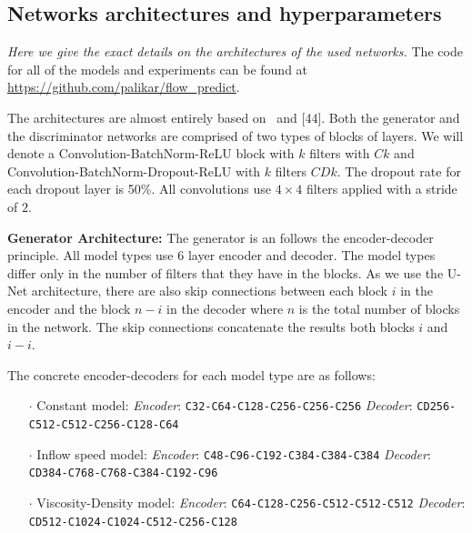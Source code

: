 \documentclass{llncs}
\begin{document}
\begin{subappendices}
\renewcommand{\thesection}{\Alph{section}}%

\section{Networks architectures and hyperparameters}
\label{app1}
\emph{Here we give the exact details on the architectures of the used networks.} The code for all of the models and experiments can be found at \url{https://github.com/palikar/flow_predict}.

The architectures are almost entirely based on~\cite{pix2pix} and [44]. Both the generator and the discriminator networks are comprised of two types of blocks of layers. We will denote a Convolution-BatchNorm-ReLU block with $k$ filters with $Ck$ and Convolution-BatchNorm-Dropout-ReLU with $k$ filters $CDk$. The dropout rate for each dropout layer is 50\%. All convolutions use $4\times4$ filters applied with a stride of $2$.

\noindent\textbf{Generator Architecture:}
The generator is an follows the encoder-decoder principle. All model types use 6 layer encoder and decoder. The model types differ only in the number of filters that they have in the blocks. As we use the U-Net architecture, there are also skip connections between each block $i$ in the encoder and the block $n-i$ in the decoder where $n$ is the total number of blocks in the network. The skip connections concatenate the results both blocks $i$ and $i-i$.

The concrete encoder-decoders for each model type are as follows:
\begin{itemize}
\item[$\cdot$] Constant model:\newline
  \emph{Encoder}: \texttt{C32-C64-C128-C256-C256-C256}\newline
  \emph{Decoder}: \texttt{CD256-C512-C512-C256-C128-C64}
\item[$\cdot$] Inflow speed model:\newline
  \emph{Encoder}: \texttt{C48-C96-C192-C384-C384-C384}\newline
  \emph{Decoder}: \texttt{CD384-C768-C768-C384-C192-C96}
\item[$\cdot$] Viscosity-Density model:\newline
  \emph{Encoder}: \texttt{C64-C128-C256-C512-C512-C512} \newline
  \emph{Decoder}: \texttt{CD512-C1024-C1024-C512-C256-C128}
\end{itemize}


\end{subappendices}
\end{document}
